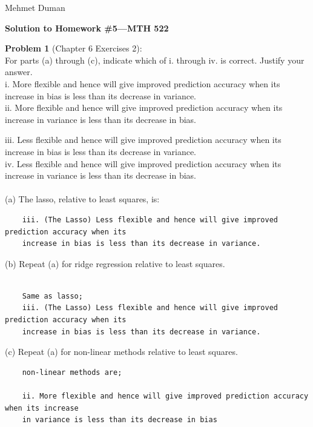 \documentclass{article}
\begin{document}
\begin{flushright}
	Mehmet Duman
\end{flushright}

\begin{center}
{\Large {\bf Solution to Homework \#5---MTH 522} }
\end{center}

{\bf Problem 1} (Chapter 6 Exercises 2):\\
For parts (a) through (c), indicate which of i. through iv. is correct. Justify your answer.\\

i. More flexible and hence will give improved prediction accuracy when its increase in bias is less than its decrease in variance.\\

ii. More flexible and hence will give improved prediction accuracy when its increase in variance is less than its decrease in bias.\

iii. Less flexible and hence will give improved prediction accuracy when its increase in bias is less than its decrease in variance.\\

iv. Less flexible and hence will give improved prediction accuracy when its increase in variance is less than its decrease in bias.\\
\\

(a) The lasso, relative to least squares, is:\\
\begin{program}
	\begin{verbatim}
	iii. (The Lasso) Less flexible and hence will give improved prediction accuracy when its 
	increase in bias is less than its decrease in variance.
	\end{verbatim}
\end{program}


(b) Repeat (a) for ridge regression relative to least squares.\\
\\
\begin{program}
	\begin{verbatim}
	Same as lasso;
	iii. (The Lasso) Less flexible and hence will give improved prediction accuracy when its 
	increase in bias is less than its decrease in variance.
	\end{verbatim}
\end{program}

(c) Repeat (a) for non-linear methods relative to least squares.\\
\begin{program}
	\begin{verbatim}
	non-linear methods are;
	
	ii. More flexible and hence will give improved prediction accuracy when its increase 
	in variance is less than its decrease in bias	
	\end{verbatim}
\end{program}
\end{document}
